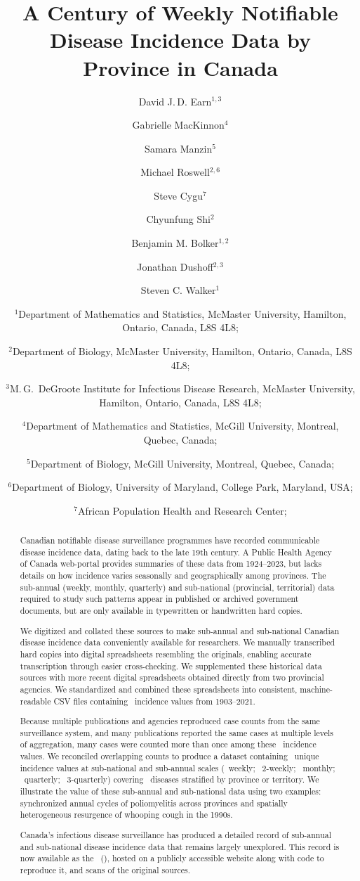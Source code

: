\documentclass[12pt]{article}
\title{A Century of Weekly Notifiable Disease Incidence Data by Province in Canada}
\author{
     David J.\,D. Earn$^{1,3}$
\and Gabrielle MacKinnon$^4$
\and Samara Manzin$^5$
\and Michael Roswell$^{2,6}$ %
\and Steve Cygu$^7$ %
\and Chyunfung Shi$^2$ %
\and Benjamin M. Bolker$^{1,2}$ %
\and Jonathan Dushoff$^{2,3}$ %
\and Steven C. Walker$^1$
\and \footnotesize$^1$Department of Mathematics and Statistics,
     McMaster University, Hamilton, Ontario, Canada, L8S 4L8;
\and \footnotesize$^2$Department of Biology,
     McMaster University, Hamilton, Ontario, Canada, L8S 4L8;
\and \footnotesize$^3$M.\,G.\ DeGroote Institute for Infectious Disease Research,
  McMaster University, Hamilton, Ontario, Canada, L8S 4L8;
\and \footnotesize$^4$Department of Mathematics and Statistics,
  McGill University, Montreal, Quebec, Canada;
\and \footnotesize$^5$Department of Biology,
  McGill University, Montreal, Quebec, Canada;
\and \footnotesize$^6$Department of Biology,
  University of Maryland, College Park, Maryland, USA;
\and \footnotesize$^7$African Population Health and Research Center;
  \\
}
\begin{document}
\maketitle


\newpage

\begin{abstract}

Canadian notifiable disease surveillance programmes have recorded communicable disease incidence data, dating back to the late 19th century. A Public Health Agency of Canada web-portal provides summaries of these data from 1924--2023, but lacks details on how incidence varies seasonally and geographically among provinces. The sub-annual (weekly, monthly, quarterly) and sub-national (provincial, territorial) data required to study such patterns appear in published or archived government documents, but are only available in typewritten or handwritten hard copies.

We digitized and collated these sources to make sub-annual and sub-national Canadian disease incidence data conveniently available for researchers. We manually transcribed hard copies into digital spreadsheets resembling the originals, enabling accurate transcription through easier cross-checking. We supplemented these historical data sources with more recent digital spreadsheets obtained directly from two provincial agencies. We standardized and combined these spreadsheets into consistent, machine-readable CSV files containing \ incidence values from 1903--2021.

Because multiple publications and agencies reproduced case counts from the same surveillance system, and many publications reported the same cases at multiple levels of aggregation, many cases were counted more than once among these \ incidence values. We reconciled overlapping counts to produce a dataset containing \ unique incidence values at sub-national and sub-annual scales (\ weekly; \ 2-weekly; \ monthly; \ quarterly; \ 3-quarterly) covering \ diseases stratified by province or territory. We illustrate the value of these sub-annual and sub-national data using two examples: synchronized annual cycles of poliomyelitis across provinces and spatially heterogeneous resurgence of whooping cough in the 1990s.

Canada's infectious disease surveillance has produced a detailed record of sub-annual and sub-national disease incidence data that remains largely unexplored. This record is now available as the \datname\ (\datacronym), hosted on a publicly accessible website along with code to reproduce it, and scans of the original sources.

\end{abstract}
\end{document}

